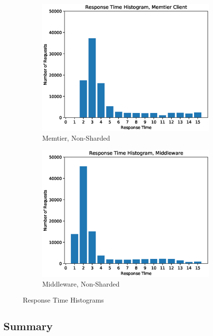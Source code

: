 \documentclass[11pt,a4paper]{article}
\begin{document}
\begin{figure}
    \begin{subfigure}{.5\textwidth}
        \includegraphics[width=1\linewidth]{plots/logSection5d_histogramMemtier.eps}
        \caption{Memtier, Non-Sharded}
    \end{subfigure}
    \begin{subfigure}{.5\textwidth}
        \includegraphics[width=1\linewidth]{plots/logSection5d_histogramMiddleware.eps}
        \caption{Middleware, Non-Sharded}
    \end{subfigure}
    \caption{Response Time Histograms}
    \label{fig:5-1:Histograms}
\end{figure}

\subsection{Summary}
\end{document}
